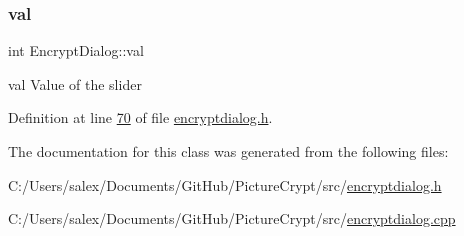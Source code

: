 \mbox{\label{class_encrypt_dialog_a3c9da51b5e9d98d702bcc4ed15405fd5}} 
\subsubsection{\texorpdfstring{val}{val}}
{\footnotesize\ttfamily int Encrypt\+Dialog\+::val}



val Value of the slider 



Definition at line \mbox{\hyperlink{encryptdialog_8h_source_l00070}{70}} of file \mbox{\hyperlink{encryptdialog_8h_source}{encryptdialog.\+h}}.



The documentation for this class was generated from the following files\+:\begin{DoxyCompactItemize}
\item 
C\+:/\+Users/salex/\+Documents/\+Git\+Hub/\+Picture\+Crypt/src/\mbox{\hyperlink{encryptdialog_8h}{encryptdialog.\+h}}\item 
C\+:/\+Users/salex/\+Documents/\+Git\+Hub/\+Picture\+Crypt/src/\mbox{\hyperlink{encryptdialog_8cpp}{encryptdialog.\+cpp}}\end{DoxyCompactItemize}
